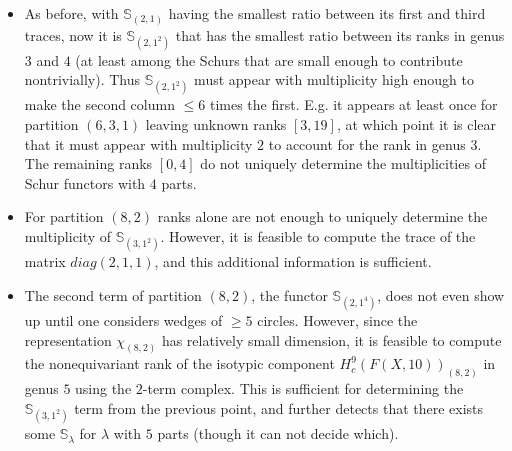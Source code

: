 \documentclass[12pt]{article}
\newcommand{\SymGroup}[1][n]{\mathfrak{S}_{#1}}
\newcommand{\Specht}[1]{\chi_{#1}}
\newcommand{\Schur}[1]{\mathbb{S}_{#1}}
\theoremstyle{plain}
\theoremstyle{definition}
\theoremstyle{remark}
\begin{document}
\begin{itemize}
    \item As before, with $\Schur{(2,1)}$ having the smallest ratio between its first and third traces, now it is $\Schur{(2,1^2)}$ that has the smallest ratio between its ranks in genus $3$ and $4$ (at least among the Schurs that are small enough to contribute nontrivially). Thus $\Schur{(2,1^2)}$ must appear with multiplicity high enough to make the second column $\leq 6$ times the first. E.g. it appears at least once for partition $(6,3,1)$ leaving unknown ranks $[3,19]$, at which point it is clear that it must appear with multiplicity $2$ to account for the rank in genus $3$. The remaining ranks $[0,4]$ do not uniquely determine the multiplicities of Schur functors with $4$ parts.

    \item %
    For partition $(8,2)$ ranks alone are not enough to uniquely determine the multiplicity of $\Schur{(3,1^2)}$. However, it is feasible to compute the trace of the matrix $diag(2,1,1)$, and this additional information is sufficient.
    \item The second term of partition $(8,2)$, the functor $\Schur{(2,1^4)}$, does not even show up until one considers wedges of $\geq 5$ circles. However, since the representation $\Specht{(8,2)}$ has relatively small dimension, it is feasible to compute the nonequivariant rank of the isotypic component $H^9_c(F(X,10))_{(8,2)}$ in genus $5$ using the $2$-term complex. This is sufficient for determining the $\Schur{(3,1^2)}$ term from the previous point, and further detects that there exists some $\Schur{\lambda}$ for $\lambda$ with $5$ parts (though it can not decide which). 


\end{itemize}
\end{document}
